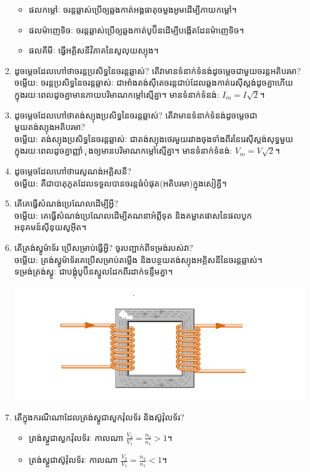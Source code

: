 \documentclass{officialexam}
\begin{document}
\begin{enumerate}[m]
\begin{itemize}
			\item ផលកម្តៅៈ ចរន្តឆ្លាស់ប្រើឲ្យឆ្លងកាត់អង្គធាតុចម្លងអូមដើម្បីភាយកម្តៅ។
			\item ផលម៉ាញេទិចៈ ចរន្តឆ្លាស់ប្រើឲ្យឆ្លងកាត់បូប៊ីនដើម្បីបង្កើតដែនម៉ាញេទិច។
			\item ផលគីមីៈ ធ្វើអគ្គិសនីវិភាគនៃសូលុយស្យុង។
		\end{itemize}
		\item ដូចម្តេចដែលហៅថាចរន្តប្រសិទ្ធនៃចរន្តឆ្លាស់? តើវាមានទំនាក់ទំនង់ដូចម្តេចជាមួយចរន្តអតិបរមា?\\
		{\color{red}\sffamily ចម្លើយ}: ចរន្តប្រសិទ្ធនៃចរន្តឆ្លាស់ៈ ជាអាំងតង់សុីតេចរន្តជាប់ដែលឆ្លងកាត់រេសុីស្តង់ដូចគ្នាហើយក្នុងរយៈពេលដូចគ្នាមានភាយបរិមាណកម្តៅស្មើគ្នា។ មានទំនាក់ទំនង់: $I_{m}=I\sqrt{2}$។
		\item ដូចម្តេចដែលហៅថាតង់ស្យុងប្រសិទ្ធនៃចរន្តឆ្លាស់? តើវាមានទំនាក់ទំនង់ដូចម្តេចជាមួយតង់ស្យុងអតិបរមា?\\
		{\color{red}\sffamily ចម្លើយ}: តង់ស្យុងប្រសិទ្ធនៃចរន្តឆ្លាស់ៈ ជាតង់ស្យុងថេរមួយរវាងចុងទាំងពីរនៃរេសុីស្តង់សុទ្ធមួយក្នុងរយៈពេលដូចគ្នាញ្ញាំុងឲ្យមានបរិមាណកម្តៅស្មើគ្នា។ មានទំនាក់ទំនង់: $V_{m}=V\sqrt{2}$។
		\item ដូចម្តេចដែលហៅថារេសូណង់អគ្គិសនី?\\
		{\color{red}\sffamily ចម្លើយ}: គឺជាបាតុភូតដែលទទួលបានចរន្តធំបំផុត(អតិបរមា)ក្នុងសៀគ្វី។
		\item តើគេធ្វើសំណង់ប្រេណែលដើម្បីអ្វី?\\
		{\color{red}\sffamily ចម្លើយ}: គេធ្វើសំណង់ប្រេណែលដើម្បីគណនាអំព្លីទុត និងគម្លាតផាសនៃផលបូកអនុគមន៍សុីនុយសូអុីត។
		\item តើត្រង់ស្វូម៉ាទ័រ ប្រើសម្រាប់ធ្វើអ្វី? ចូរបញ្ជាក់ពីទម្រង់របស់វា?\\
		{\color{red}\sffamily ចម្លើយ}: ត្រង់ស្វូម៉ាទ័រគេប្រើសម្រាប់តម្លើង និងបន្ថយតង់ស្យុងអគ្គិសនីនៃចរន្តឆ្លាស់។\\
		ទម្រង់ត្រង់ស្វូៈ ជាបង្គុំបូប៊ីនស្នូលដែកពីរដាក់ទន្ទឹមគ្នា។
		\begin{center}
			\includegraphics[scale=1.8]{image1}
		\end{center}
		\item តើក្នុងករណីណាដែលត្រង់ស្វូជាសួកវ៉ុលទ័រ និងស៊ូវ៉ុលទ័រ?
		\begin{itemize}
			\item ត្រង់ស្វួជាសួកវ៉ុលទ័រៈ  កាលណា $\frac{V_{2}}{V_{1}}=\frac{n_{2}}{n_{1}}>1$។
			\item ត្រង់ស្វួជាស៊ូវ៉ុលទ័រៈ  កាលណា $\frac{V_{2}}{V_{1}}=\frac{n_{2}}{n_{1}}<1$។
		\end{itemize}
	\end{enumerate}
\end{document}
